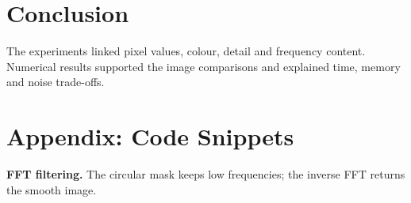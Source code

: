 \documentclass[10pt,a4paper]{article}
\begin{document}
\section{Conclusion}
The experiments linked pixel values, colour, detail and frequency content.
Numerical results supported the image comparisons and explained time, memory
and noise trade-offs.

\section*{Appendix: Code Snippets}
\textbf{FFT filtering.} The circular mask keeps low frequencies; the inverse FFT returns the smooth image.

\end{document}
